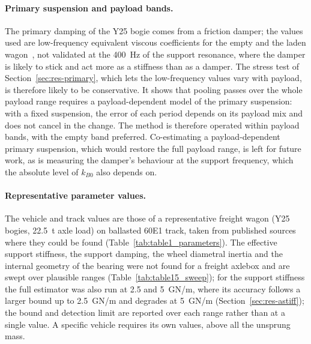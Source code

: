 \paragraph{Primary suspension and payload bands.} The primary damping of the Y25 bogie comes from a
friction damper; the values used are low-frequency equivalent viscous coefficients for the empty and the
laden wagon~\citep{dusza2024}, not validated at the 400~Hz of the support resonance, where the damper is
likely to stick and act more as a stiffness than as a damper. The stress test of
Section~\ref{sec:res-primary}, which lets the low-frequency values vary with payload, is therefore likely
to be conservative. It shows that pooling passes over the whole payload range requires a
payload-dependent model of the primary suspension: with a fixed suspension, the error of each period
depends on its payload mix and does not cancel in the change. The method is therefore operated within
payload bands, with the empty band preferred. Co-estimating a payload-dependent primary suspension, which
would restore the full payload range, is left for future work, as is measuring the damper's behaviour at
the support frequency, which the absolute level of $k_{B0}$ also depends on.

\paragraph{Representative parameter values.} The vehicle and track values are those of a
representative freight wagon (Y25 bogies, 22.5~t axle load) on ballasted 60E1 track, taken from
published sources where they could be found (Table~\ref{tab:table1_parameters}). The effective support
stiffness, the support damping, the wheel diametral inertia and the internal geometry of the bearing
were not found for a freight axlebox and are swept over plausible ranges
(Table~\ref{tab:table15_sweep}); for the support stiffness the full estimator was also run at 2.5 and
5~GN/m, where its accuracy follows a larger bound up to 2.5~GN/m and degrades at 5~GN/m
(Section~\ref{sec:res-astiff}); the bound and detection limit are reported over each range rather
than at a single value. A specific vehicle requires its own values, above all the unsprung mass.

